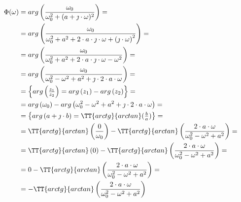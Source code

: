 \begin{task}
\begin{figure}[H]
\end{figure}



\begin{align*}
\Phi ( \omega )&=arg\left( \frac{\omega_{0}}{\omega_{0}^{2} + (a + \jmath \cdot \omega)^{2}} \right)=\\
&=arg\left( \frac{\omega_{0}}{\omega_{0}^{2} + a^2 + 2\cdot a \cdot \jmath \cdot \omega + \left(\jmath \cdot \omega\right)^{2}}\right)=\\
&=arg\left( \frac{\omega_{0}}{\omega_{0}^{2} + a^2 + 2\cdot a \cdot \jmath \cdot \omega - \omega^{2}}\right)=\\
&=arg\left( \frac{\omega_{0}}{\omega_{0}^{2}- \omega^{2} + a^2 + \jmath \cdot 2\cdot a \cdot \omega }\right)=\\
&=\begin{Bmatrix}
arg\left(\frac{z_1}{z_2}\right) = arg\left(z_1\right) -arg\left(z_2\right)
\end{Bmatrix}=\\
&=arg\left( \omega_{0}\right) - arg\left(\omega_{0}^{2}- \omega^{2} + a^2 + \jmath \cdot 2\cdot a \cdot \omega \right)=\\
&=\begin{Bmatrix}
arg\left(a + \jmath \cdot b\right) = \TT{arctg}{arctan}(\frac{b}{a})\\
\end{Bmatrix}=\\
&=\TT{arctg}{arctan}\left(\frac{0}{\omega_0}\right) - \TT{arctg}{arctan}\left(\frac{2\cdot a \cdot \omega}{\omega_0^2-\omega^2+a^2}\right)=\\
&=\TT{arctg}{arctan}\left(0\right) - \TT{arctg}{arctan}\left(\frac{2\cdot a \cdot \omega}{\omega_0^2-\omega^2+a^2}\right)=\\
&=0 - \TT{arctg}{arctan}\left(\frac{2\cdot a \cdot \omega}{\omega_0^2-\omega^2+a^2}\right)=\\
&=- \TT{arctg}{arctan}\left(\frac{2\cdot a \cdot \omega}{\omega_0^2-\omega^2+a^2}\right)
\end{align*}


\end{task}
